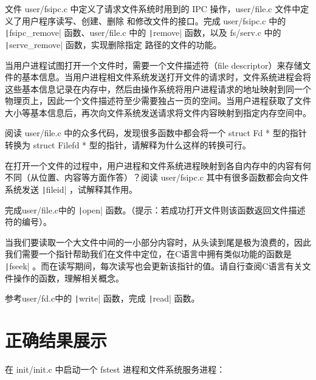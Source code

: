 \begin{exercise}
文件 user/fsipc.c 中定义了请求文件系统时用到的 IPC 操作，user/file.c 文件中定义了用户程序读写、创建、删除
和修改文件的接口。完成 user/fsipc.c 中的 \texttt|fsipc_remove| 函数、user/file.c 中的
\texttt|remove| 函数，以及 fs/serv.c 中的 \texttt|serve_remove| 函数，实现删除指定
路径的文件的功能。
\end{exercise}

当用户进程试图打开一个文件时，需要一个文件描述符（file descriptor）来存储文件的基本信息。当用户进程相文件系统发送打开文件的请求时，文件系统进程会将这些基本信息记录在内存中，然后由操作系统将用户进程请求的地址映射到同一个物理页上，因此一个文件描述符至少需要独占一页的空间。当用户进程获取了文件大小等基本信息后，再次向文件系统发送请求将文件内容映射到指定内存空间中。

\begin{thinking}\label{think-Filefd-Fd}
阅读 user/file.c 中的众多代码，发现很多函数中都会将一个 struct Fd * 型的指针转换为 struct Filefd * 型的指针，请解释为什么这样的转换可行。
\end{thinking}

\begin{thinking}\label{think-fileid}
在打开一个文件的过程中，用户进程和文件系统进程映射到各自内存中的内容有何不同（从位置、内容等方面作答）？阅读 user/fsipc.c 其中有很多函数都会向文件系统发送 \texttt|fileid| ，试解释其作用。
\end{thinking}

\begin{exercise}
完成user/file.c中的 \texttt|open| 函数。（提示：若成功打开文件则该函数返回文件描述符的编号）。
\end{exercise}

当我们要读取一个大文件中间的一小部分内容时，从头读到尾是极为浪费的，因此我们需要一个指针帮助我们在文件中定位，在C语言中拥有类似功能的函数是 \texttt|fseek| 。而在读写期间，每次读写也会更新该指针的值。请自行查阅C语言有关文件操作的函数，理解相关概念。

\begin{exercise}
参考user/fd.c中的 \texttt|write| 函数，完成 \texttt|read| 函数。
\end{exercise}


\section{正确结果展示}

在 init/init.c 中启动一个 fstest 进程和文件系统服务进程：

